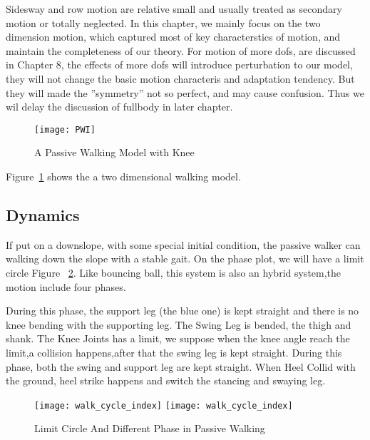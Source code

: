 Sidesway and row motion are relative small and usually treated as secondary motion or totally neglected.
In this chapter, we mainly focus on the two dimension motion, which captured most of key characterstics of motion, and maintain the completeness of our theory.
For motion of more dofs, are discussed in Chapter 8, the effects of more dofs will introduce perturbation to our model, they will not change the basic motion characteris and adaptation tendency.
But they will made the ''symmetry'' not so perfect, and may cause confusion.
Thus we wil delay the discussion of fullbody in later chapter.

\begin{figure}[!htbp]
  \begin{center}
      \texttt{[image: PWI]}
    \caption{A Passive Walking Model with Knee}
    \label{fig:passivekneewalker}
\end{center}
\end{figure}


Figure~\ref{fig:passivekneewalker} shows the a two dimensional walking model.
\subsection*{Dynamics}
If put on a downslope, with some special initial condition, the passive walker can walking down the slope with a stable gait.
On the phase plot, we will have a limit circle Figure ~\ref{fig:fourphaselimitcycle}.
Like bouncing ball, this system is also an hybrid system,the motion include four phases\citep{Chen2007}.
\begin{itemize}
During this phase, the support leg (the blue one) is kept straight and there is no knee bending with the supporting leg.
The Swing Leg is bended, the thigh and shank.
The Knee Joints has a limit, we suppose when the knee angle reach the limit,a collision happens,after that the swing leg is kept straight.
During this phase, both the swing and support leg are kept straight.
When Heel Collid with the ground, heel strike happens and switch the stancing and swaying leg.
\end{itemize}

\begin{figure}[!htbp]
  \begin{center}
    \leavevmode
    \ifpdf
      \texttt{[image: walk\_cycle\_index]}
    \else
      \texttt{[image: walk\_cycle\_index]}
    \fi
    \caption{Limit Circle And Different Phase in Passive Walking}
    \label{fig:fourphaselimitcycle}
\end{center}
\end{figure}


